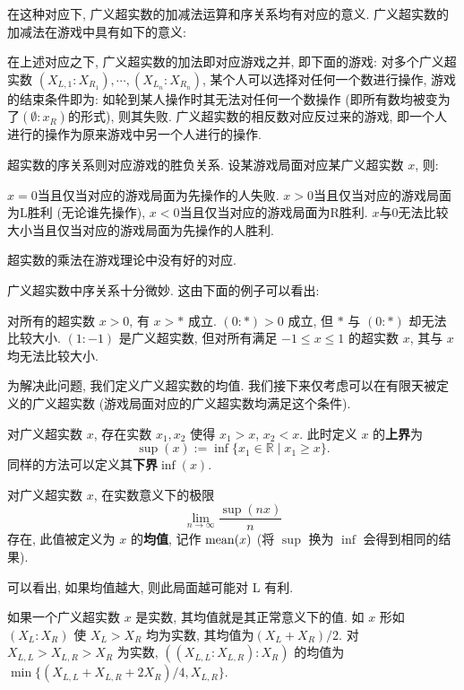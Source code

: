 在这种对应下, 广义超实数的加减法运算和序关系均有对应的意义.
广义超实数的加减法在游戏中具有如下的意义: 
\begin{theorem}
  在上述对应之下, 广义超实数的加法即对应游戏之并, 即下面的游戏: 对多个广义超实数 $(X_{L,1}:X_{R_1}),\cdots,(X_{L_n}:X_{R_n})$, 某个人可以选择对任何一个数进行操作, 游戏的结束条件即为: 如轮到某人操作时其无法对任何一个数操作 (即所有数均被变为了$(\emptyset:x_R)$的形式), 则其失败. 广义超实数的相反数对应反过来的游戏, 即一个人进行的操作为原来游戏中另一个人进行的操作.
\end{theorem}
超实数的序关系则对应游戏的胜负关系. 设某游戏局面对应某广义超实数 $x$, 则: 
\begin{theorem}
  $x=0$当且仅当对应的游戏局面为先操作的人失败. $x>0$当且仅当对应的游戏局面为L胜利 (无论谁先操作), $x<0$当且仅当对应的游戏局面为R胜利. $x$与$0$无法比较大小当且仅当对应的游戏局面为先操作的人胜利.
\end{theorem}
\begin{remark}
  超实数的乘法在游戏理论中没有好的对应.
\end{remark}
广义超实数中序关系十分微妙. 这由下面的例子可以看出: 
\begin{example}
  对所有的超实数 $x>0$, 有 $x>*$ 成立. $(0:*)>0$ 成立, 但 $*$ 与 $(0:*)$ 却无法比较大小. $(1:-1)$ 是广义超实数, 但对所有满足 $-1\leq x\leq 1$ 的超实数 $x$, 其与 $x$ 均无法比较大小.
\end{example}
为解决此问题, 我们定义广义超实数的均值. 我们接下来仅考虑可以在有限天被定义的广义超实数 (游戏局面对应的广义超实数均满足这个条件).
\begin{definition}
  对广义超实数 $x$, 存在实数 $x_1,x_2$ 使得 $x_1>x$, $x_2<x$. 此时定义 $x$ 的\textbf{上界}为
  \[
    \sup(x):=\inf\{x_1\in \mathbb{R}\mid x_1\geq x\}.
  \]
  同样的方法可以定义其\textbf{下界}$\inf(x)$.
\end{definition}
\begin{definition}
  对广义超实数 $x$, 在实数意义下的极限
  \[
    \lim_{n\to \infty} \frac{\sup(nx)}{n}
  \]
  存在, 此值被定义为 $x$ 的\textbf{均值}, 记作 $\operatorname{mean}(x)$ (将 $\sup$ 换为 $\inf$ 会得到相同的结果).
\end{definition}
可以看出, 如果均值越大, 则此局面越可能对 L 有利.
\begin{example}
  如果一个广义超实数 $x$ 是实数, 其均值就是其正常意义下的值. 如 $x$ 形如 $(X_L:X_R)$ 使 $X_L>X_R$ 均为实数, 其均值为$(X_L+X_R)/2$. 对$X_{L,L}>X_{L,R}>X_R$ 为实数, $((X_{L,L}:X_{L,R}):X_R)$ 的均值为 $\min\{(X_{L,L}+X_{L,R}+2X_R)/4,X_{L,R}\}$.
\end{example}
